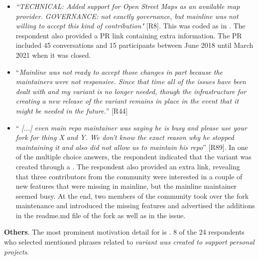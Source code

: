\begin{itemize}[leftmargin=*]
\item \emph{``TECHNICAL: Added support for Open Street Maps as an available map provider. GOVERNANCE: not exactly governance, but mainline was not willing to accept this kind of contribution"} [R8]. This was coded as  in . The respondent also provided a \gh PR link containing extra information. The PR included 45 conversations and 15 participants between June 2018 until March 2021 when it was closed.

\item ``\emph{Mainline was not ready to accept those changes in part because the maintainers were not responsive. Since that time all of the issues have been dealt with and my variant is no longer needed, though the infrastructure for creating a new release of the variant remains in place in the event that it might be needed in the future.}'' [R44]

\item ``\emph{%
[...] even main repo maintainer was saying he is busy and please use your fork for thing X and Y. We don't know the exact reason why he stopped maintaining it and also did not allow us to maintain his repo}'' [R89]. In one of the multiple choice answers, the respondent indicated that the variant was created through a  .
The respondent also provided an extra link, revealing that
three contributors from the community were interested in a couple of new features that were missing in mainline, but the mainline maintainer seemed busy. At the end, two members of the community took over the fork maintenance and introduced the missing features and advertised the additions in the \textsf{readme.md} file of the fork as well as in the issue.

\end{itemize}


\nd \textbf{Others}. %
The most prominent motivation detail for  is  . 8 of the 24 respondents who selected  mentioned phrases related to \emph{variant was created to support personal projects}.


